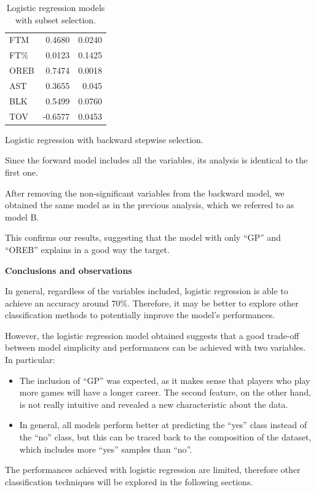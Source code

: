 \begin{table}[H]
\begin{subtable}[h]{0.3\textwidth}
\begin{tabular}{|| l | r | r ||}
			FTM & 0.4680 & 0.0240 \\
			FT\% & 0.0123 & 0.1425 \\
			OREB & 0.7474 & 0.0018 \\
			AST & 0.3655 & 0.045 \\
			BLK & 0.5499 & 0.0760 \\				
			TOV & -0.6577 & 0.0453 \\
			\hline
		\end{tabular}
		\caption{Logistic regression with backward stepwise selection.}
		\label{table:LRBSSum}
	\end{subtable}
	\caption{Logistic regression models with subset selection.}
	\label{table:LRSSum}
\end{table}

Since the forward model includes all the variables, its analysis is identical to the first one.

After removing the non-significant variables from the backward model, we obtained the same model as in the previous analysis, which we referred to as model B. 

This confirms our results, suggesting that the model with only ``GP'' and ``OREB'' explains in a good way the target. 

\vspace{0.2cm}
\textbf{Conclusions and observations}

In general, regardless of the variables included, logistic regression is able to achieve an accuracy around $70\%$. Therefore, it may be better to explore other classification methods to potentially improve the model's performances.

However, the logistic regression model obtained suggests that a good trade-off between model simplicity and performances can be achieved with two variables. In particular:

\begin{itemize}
	\item The inclusion of ``GP'' was expected, as it makes sense that players who play more games will have a longer career. The second feature, on the other hand, is not really intuitive and revealed a new characteristic about the data.
	\item In general, all models perform better at predicting the ``yes'' class instead of the ``no'' class, but this can be traced back to the composition of the dataset, which includes more ``yes'' samples than ``no''.
\end{itemize}

The performances achieved with logistic regression are limited, therefore other classification techniques will be explored in the following sections.
